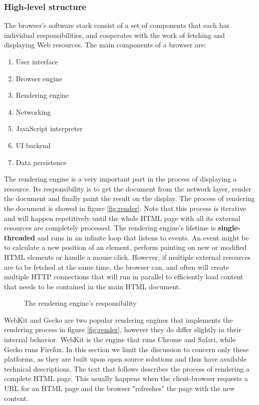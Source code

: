\subsubsection{High-level structure}
The browser's software stack consist of a set of components that each has individual responsibilities, and cooperates with the work of fetching and displaying Web resources. The main components of a browser are:
\begin {enumerate}
\item User interface
\item Browser engine
\item Rendering engine
\item Networking
\item JavaScript interpreter
\item UI backend
\item Data persistence
\end{enumerate} 

The rendering engine is a very important part in the process of displaying a resource. Its responsibility is to get the document from the network layer, render the document and finally paint the result on the display. The process of rendering the document is showed in figure \vref{fig:render}. Note that this process is iterative and will happen repetitively until the whole HTML page with all its external resources are completely processed. The rendering engine's lifetime is \textbf{single-threaded} and runs in an infinite loop that listens to events. An event might be to calculate a new position of an element, perform painting on new or modified HTML elements or handle a mouse click. However, if multiple external resources are to be fetched at the same time, the browser can, and often will create multiple HTTP connections that will run in parallel to efficiently load content that needs to be contained in the main HTML document. 

\begin{figure}
\begin{center}
\end{center}
\caption{The rendering engine's responsibility}\label{fig:render}
\end{figure}

WebKit\cite{webkit} and Gecko\cite{gecko} are two popular rendering engines that implements the rendering process in figure \vref{fig:render}, however they do differ slightly in their internal behavior. WebKit is the engine that runs Chrome and Safari, while Gecko runs Firefox. In this section we limit the discussion to concern only these platforms, as they are built upon open source solutions and thus have available technical descriptions. The text that follows describes the process of rendering a complete HTML page. This usually happens when the client-browser requests a URL for an HTML page and the browser "refreshes" the page with the new content.

